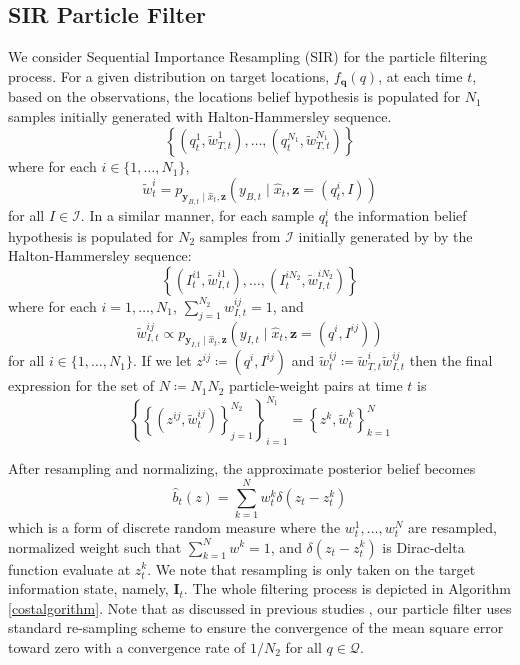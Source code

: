 \documentclass[letterpaper, 10 pt, conference]{ieeeconf}
\begin{document}
\subsection{SIR Particle Filter}
We consider Sequential Importance Resampling (SIR) \cite{arulampalam2002tutorial} for the particle filtering process.
For a given distribution on target locations, $f_{\bm{q}}(q)$, at each time $t$, based on the observations, the locations belief hypothesis is populated for $N_1$ samples initially generated with Halton-Hammersley sequence.
\begin{equation}
\left\{ \left( q_t^{1},\widetilde{w}_{T,t}^{1}\right),\dots,\left(q_t^{N_1},\widetilde{w}_{T,t}^{N_1}\right)\right\}
\end{equation}
where for each $i \in \lbrace 1,\dots,N_1 \rbrace$,
\begin{equation}
\widetilde{w}_t^{i} =
p_{\bm{y}_{B,t} \mid
	\hat{x}_{t},\bm{z}}\left(
y_{B,t} \mid
\hat{x}_{t},\bm{z}=(q_t^i,I)\right) 
\end{equation}
for all $I \in \mathcal{I}$. In a similar manner, for each sample $q_t^{i}$
the information belief hypothesis is populated for $N_2$ samples from $\mathcal{I}$ initially generated by by the Halton-Hammersley sequence:
\begin{equation}
\left\{
\left(
I_t^{i1},\widetilde{w}_{I,t}^{i1}\right),\dots,
\left(I_t^{iN_2},\widetilde{w}_{I,t}^{iN_2}\right)
\right\}
\end{equation}
where for each $i = 1,\dots,N_1$, $\sum_{j=1}^{N_2} w_{I,t}^{ij} = 1$, and 
\begin{equation}
\widetilde{w}_{I,t}^{ij} \propto
p_{\bm{y}_{I,t} \mid
	\hat{x}_{t},\bm{z}}\left(
y_{I,t} \mid
\hat{x}_{t},\bm{z}=(q^i,I^{ij})\right)
\end{equation}
for all $i \in \lbrace 1,\dots,N_1 \rbrace$.
If we let $z^{ij} \coloneqq (q^{i},I^{ij})$ and $\widetilde{w}_t^{ij} \coloneqq \widetilde{w}_{T,t}^{i}\widetilde{w}_{I,t}^{ij}$ then the final expression for the set of $N\coloneqq N_1N_2$ particle-weight pairs at time $t$ is
\begin{equation}
\left\{
\left\{
(z^{ij},\widetilde{w}_t^{ij})
\right\}_{j=1}^{N_2}
\right\}_{i=1}^{N_1}
= \left\{
z^k,\widetilde{w}_t^k
\right\}_{k=1}^N
\end{equation}

After resampling and normalizing, the approximate posterior belief becomes
\begin{equation}
\hat{b}_t(z) = \sum_{k=1}^{N} 
w_t^{k} \delta(z_t - z_t^{k})
\end{equation}
which is a form of discrete random measure where the $w_t^1,\dots,w_t^N$ are resampled, normalized weight such that $\sum_{k=1}^{N} w^{k} = 1$, and $\delta(z_t - z_t^{k})$ is Dirac-delta function evaluate at $z_t^{k}$. 
We note that resampling is only taken on the target information state, namely, $\bm{I}_t$.
The whole filtering process is depicted in Algorithm \ref{costalgorithm}.
Note that as discussed in previous studies \cite{crisan2002survey}, our particle filter uses standard re-sampling scheme to ensure the convergence of the mean square error toward zero with a convergence rate of $1/N_2$ for all $q \in \mathcal{Q}$. 
\end{document}
